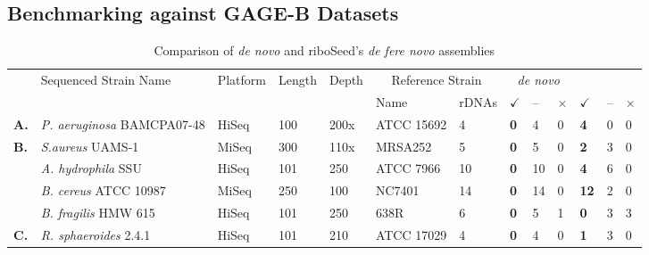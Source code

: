 \documentclass[a4,center,fleqn]{NAR}
\begin{document}
\subsection*{Benchmarking against GAGE-B Datasets}
\begin{table}[!hb]
  \centering
  \caption{Comparison of \textit{de novo} and riboSeed's \textit{de fere novo} assemblies}
  \label{table:assemblyresults}
  \begin{tabular}{p{.3cm}p{5.2cm}p{.95cm}p{.75cm}p{.75cm}p{2.63cm}p{.6cm}>{\hfill}p{.4cm}p{.2cm}p{.1cm}>{\hfill}p{.4cm}p{.2cm}p{.1cm}}
    \toprule
    & \multirow{2}{*}{Sequenced Strain Name} & \multirow{2}{*}{Platform}  & \multirow{2}{*}{Length} & \multirow{2}{*}{Depth}  &  \multicolumn{2}{c}{Reference Strain} &  \multicolumn{3}{c}{\textit{de novo}} & \multicolumn{3}{c}{\textit{de fere novo}} \\
   & & & & & Name & rDNAs & \textbf{$\checkmark$} & -- & $\times$ & \textbf{$\checkmark$} & -- & $\times$  \\
    \toprule
   \textbf{A.}  & \textit{P. aeruginosa} BAMCPA07-48 & HiSeq & 100 & 200x & ATCC 15692  & 4 & \textbf{0} & 4 & 0 & \textbf{4} & 0 & 0 \\
    \botrule
   \textbf{B.} & \textit{S.aureus} UAMS-1 & MiSeq & 300 & 110x & MRSA252  & 5 &  \textbf{0} & 5 & 0   & \textbf{2} & 3 & 0 \\
    \toprule
    & \textit{A. hydrophila} SSU   & HiSeq   & 101   & 250   & ATCC 7966 & 10 & \textbf{0} & 10 & 0  & \textbf{4} & 6 & 0  \\


    & \textit{B. cereus} ATCC 10987   & MiSeq   & 250   & 100  & NC7401 & 14 & \textbf{0} & 14 & 0  & \textbf{12} & 2 & 0  \\

    & \textit{B. fragilis} HMW 615   & HiSeq   & 101   & 250   & 638R & 6 & \textbf{0} & 5 & 1  & \textbf{0} & 3 & 3  \\

    \textbf{C.} & \textit{R. sphaeroides} 2.4.1 & HiSeq & 101 & 210 & ATCC 17029  & 4 & \textbf{0} & 4 & 0  & \textbf{1} & 3 & 0  \\


\end{tabular}
\end{table}
\end{document}
